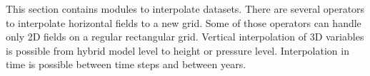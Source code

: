 This section contains modules to interpolate datasets.
There are several operators to interpolate horizontal fields
to a new grid. Some of those operators can handle only
2D fields on a regular rectangular grid.
Vertical interpolation of 3D variables is possible from
hybrid model level to height or pressure level.
Interpolation in time is possible between time steps and
between years.
